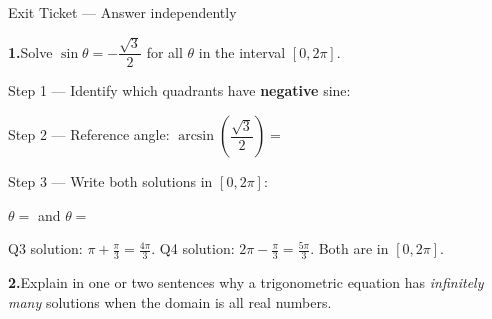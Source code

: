 \documentclass[10pt]{article}
\begin{document}
\namedateperiod

\vspace{0.10in}

\begin{notesbox}{Exit Ticket --- Answer independently}

\textbf{1.}\quad Solve $\sin\theta = -\dfrac{\sqrt{3}}{2}$ for all $\theta$
in the interval $[0, 2\pi]$.

\vspace{4pt}
Step 1 --- Identify which quadrants have \textbf{negative} sine:

\vspace{4pt}
Step 2 --- Reference angle: $\arcsin\!\left(\dfrac{\sqrt{3}}{2}\right) = $ 

\vspace{4pt}
Step 3 --- Write both solutions in $[0, 2\pi]$:

\vspace{4pt}
$\theta = $  and $\theta = $ 

\begin{teachernote}
Q3 solution: $\pi + \tfrac{\pi}{3} = \tfrac{4\pi}{3}$.
Q4 solution: $2\pi - \tfrac{\pi}{3} = \tfrac{5\pi}{3}$.
Both are in $[0, 2\pi]$.
\end{teachernote}

\vspace{0.16in}
\textbf{2.}\quad Explain in one or two sentences why a trigonometric equation
has \emph{infinitely many} solutions when the domain is all real numbers.


\end{notesbox}
\end{document}

